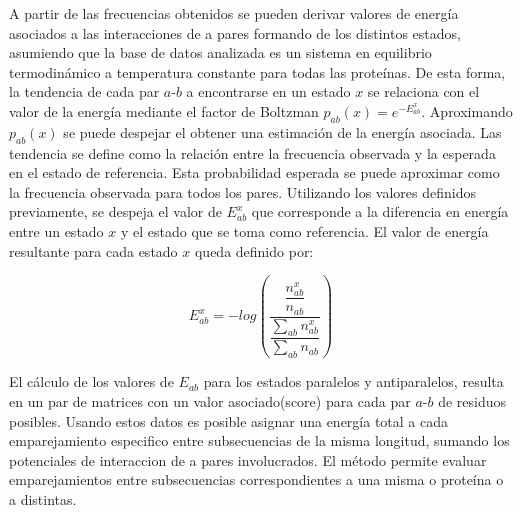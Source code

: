 A partir de las frecuencias obtenidos se pueden derivar valores de energía asociados a las interacciones de a pares formando de los distintos estados, asumiendo que la base de datos analizada es un sistema en equilibrio termodinámico 
a temperatura constante para todas las proteínas.
De esta forma, la tendencia de cada par $a$-$b$ a encontrarse en un estado $x$ se relaciona con el valor de la energía mediante el factor de Boltzman $p_{ab}(x)= e^{-E_{ab}^x}$. 
Aproximando $p_{ab}(x)$ se puede despejar el obtener una estimación de la energía asociada.
Las tendencia se define como la relación entre la frecuencia observada y la esperada en el estado de referencia. Esta probabilidad esperada se puede aproximar como la frecuencia observada para todos los pares.
Utilizando los valores definidos previamente, se despeja el valor de $E_{ab}^x$ que corresponde a la diferencia en energía entre un estado $x$ y el estado que se toma como referencia.
El valor de energía resultante para cada estado $x$ queda definido por:

\begin{equation}
{E_{ab}^x = -log\left(\dfrac{\dfrac{n_{ab}^x}{n_{ab}}} {\dfrac{\sum\limits_{ab} n_{ab}^x}{\sum\limits_{ab} n_{ab}}}\right)}
\end{equation}


El cálculo de los valores de $E_{ab}$ para los estados paralelos y antiparalelos, resulta en un par de matrices con un valor asociado(score) para cada par $a$-$b$ de residuos posibles.
Usando estos datos es posible asignar una energía total a cada emparejamiento especifico entre subsecuencias de la misma longitud, sumando los potenciales de interaccion de a pares involucrados. 
El método permite evaluar emparejamientos entre subsecuencias correspondientes a una misma o proteína o a distintas. 

